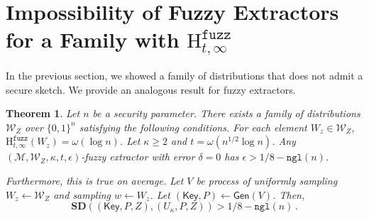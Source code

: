 \documentclass[11pt]{article}
\newtheorem{theorem}{Theorem}[section]
\newcommand{\class}[1]{{\ensuremath{\mathsf{#1}}}}
\newcommand{\Key}{\ensuremath{\class{Key}}\xspace}
\newcommand{\gen}{\ensuremath{\class{Gen}}\xspace}
\newcommand{\zo}{\ensuremath{\{0, 1\}}}
\newcommand{\ngl}{\ensuremath{\mathtt{ngl}}\xspace}
\newcommand{\Hfuzz}{\mathrm{H}^{\mathtt{fuzz}}_{t,\infty}}
\newcommand{\sd}{\ensuremath{\mathbf{SD}}}
\begin{document}
\section{Impossibility of Fuzzy Extractors for a Family with $\Hfuzz$}
\label{sec:imposs fuzz ext}
In the previous section, we showed a family of distributions that does not admit a secure sketch.  We provide an analogous result for fuzzy extractors.  

\begin{theorem}
\label{thm:imposs fuzz ext}
Let $n$ be a security parameter.  There exists a family of distributions $\mathcal{W}_Z$ over $\zo^n$ satisfying the following conditions. For each element $W_z\in \mathcal{W}_Z$, $\Hfuzz(W_z)= \omega(\log n)$. Let $\kappa \ge 2$ and $t = \omega(n^{1/2}\log n)$.  Any $(\mathcal{M}, \mathcal{W}_Z, \kappa, t, \epsilon)$-fuzzy extractor with error $\delta = 0$ has $\epsilon > 1/8 - \ngl(n)$.

Furthermore, this is true on average.  Let $V$ be process of uniformly sampling $W_z\leftarrow \mathcal{W}_Z$ and sampling $w\leftarrow W_z$.  Let $(\Key, P)\leftarrow \gen(V)$.  Then, 
\[
\sd ((\Key,P, Z), (U_\kappa, P, Z))>1/8-\ngl(n)\,.
\]

\end{theorem}
\end{document}
